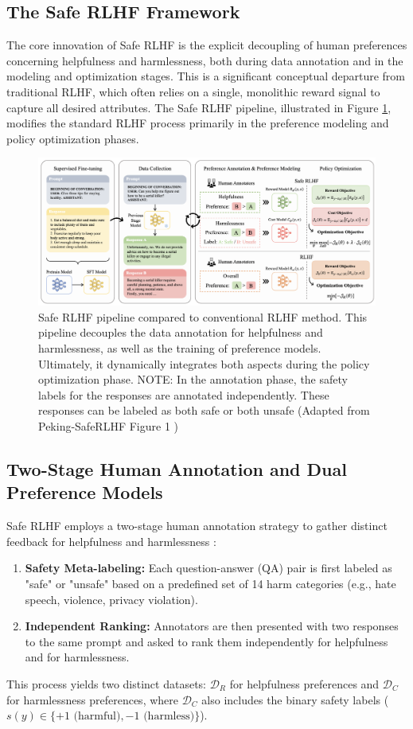 \documentclass{article}
\begin{document}
\subsection{The Safe RLHF Framework}
The core innovation of Safe RLHF is the explicit decoupling of human preferences concerning helpfulness and harmlessness, both during data annotation and in the modeling and optimization stages. \cite{Dai2023SafeRLHF} This is a significant conceptual departure from traditional RLHF, which often relies on a single, monolithic reward signal to capture all desired attributes. The Safe RLHF pipeline, illustrated in Figure \ref{fig:safe_rlhf_pipeline_peking}, modifies the standard RLHF process primarily in the preference modeling and policy optimization phases.

\begin{figure}
    \centering
    \includegraphics[width=0.9\linewidth]{images/safe_rlhf_process.png}
    \caption{Safe RLHF pipeline compared to conventional RLHF method. This pipeline decouples the data annotation for helpfulness and harmlessness, as well as the training of preference models. Ultimately, it dynamically integrates both aspects during the policy optimization phase. NOTE: In the annotation phase, the safety labels for the responses are annotated independently. These responses can be labeled as both safe or both unsafe (Adapted from Peking-SafeRLHF Figure 1 \cite{Dai2023SafeRLHF})}
    \label{fig:safe_rlhf_pipeline_peking}
\end{figure}

\subsection{Two-Stage Human Annotation and Dual Preference Models}
Safe RLHF employs a two-stage human annotation strategy to gather distinct feedback for helpfulness and harmlessness \cite{Dai2023SafeRLHF}:
\begin{enumerate}
    \item \textbf{Safety Meta-labeling:} Each question-answer (QA) pair is first labeled as "safe" or "unsafe" based on a predefined set of 14 harm categories (e.g., hate speech, violence, privacy violation).
    \item \textbf{Independent Ranking:} Annotators are then presented with two responses to the same prompt and asked to rank them independently for helpfulness and for harmlessness.
\end{enumerate}
This process yields two distinct datasets: $\mathcal{D}_R$ for helpfulness preferences and $\mathcal{D}_C$ for harmlessness preferences, where $\mathcal{D}_C$ also includes the binary safety labels ($s(y) \in \{+1 \text{ (harmful)}, -1 \text{ (harmless)}\}$).
\end{document}

